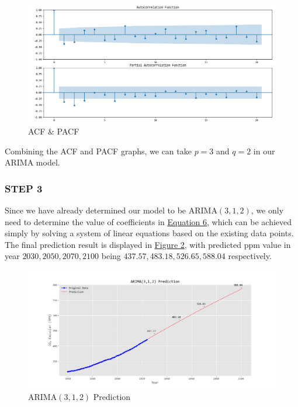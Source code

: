 \documentclass[12pt,a4paper]{article}
\begin{document}
    \begin{figure}[htbp]
        \centering
        \includegraphics[width=1\linewidth]{img/acf.png}
        \caption{ACF \& PACF}
        \label{acf}
    \end{figure}

    Combining the ACF and PACF graphs, we can take $p=3$ and $q=2$ in our ARIMA model.

    \subsubsection*{STEP 3}
    Since we have already determined our model to be ARIMA$(3,1,2)$, we only need to determine the value of coefficients in \hyperref[6]{Equation 6}, which can be achieved simply by solving a system of linear equations based on the existing data points. The final prediction result is displayed in \hyperref[arima]{Figure \ref*{arima}}, with predicted ppm value in year $2030,2050,2070,2100$ being $437.57,483.18,526.65,588.04$ respectively.

    \begin{figure}[htbp]
        \centering
        \includegraphics[width=1\linewidth]{img/arima.png}
        \caption{ARIMA$(3,1,2)$ Prediction}
        \label{arima}
    \end{figure}
\end{document}
